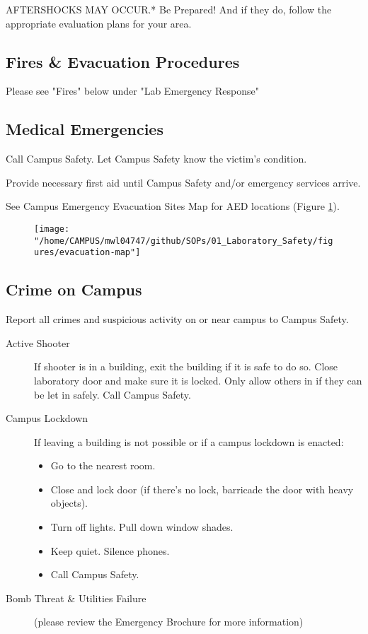\documentclass[12pt]{../SOP4_alpha}\usepackage[]{graphicx}\usepackage[]{color}
\begin{document}
\NP *AFTERSHOCKS MAY OCCUR.* Be Prepared! And if they do, follow the appropriate evaluation plans for your area.


\subsection*{Fires \& Evacuation Procedures}

Please see "Fires" below under "Lab Emergency Response"

\subsection{Medical Emergencies}

\NP Call Campus Safety. Let Campus Safety know the victim's condition. 

\NP Provide necessary first aid until Campus Safety and/or emergency services arrive.

\NP See Campus Emergency Evacuation Sites Map for AED locations (Figure \ref{fig:evacmap}).


\begin{figure}
\label{fig:evacmap}
\texttt{[image: "/home/CAMPUS/mwl04747/github/SOPs/01\_Laboratory\_Safety/figures/evacuation-map"]}
\end{figure}

\subsection*{Crime on Campus}

\NP Report all crimes and suspicious activity on or near campus to Campus Safety.

\begin{description}
  \item[Active Shooter]If shooter is in a building, exit the building if it is safe to do so. Close laboratory door and make sure it is locked. Only allow others in if they can be let in safely. Call Campus Safety.
  \item[Campus Lockdown] If leaving a building is not possible or if a campus lockdown is enacted:
\begin{itemize}
  \item Go to the nearest room.
  \item Close and lock door (if there’s no lock, barricade the door with heavy objects).
  \item Turn off lights. Pull down window shades.
  \item Keep quiet. Silence phones.
  \item Call Campus Safety.
\end{itemize}
  \item[Bomb Threat \& Utilities Failure](please review the Emergency Brochure for more information)
\end{description}
\end{document}
